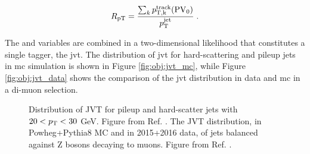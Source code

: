 \begin{equation}
R_\mathrm{pT} = \frac{\sum_k{p_{\rm{T}, k}^{{\rm track}}({\rm PV}_0)}}{p_\mathrm{T}^\mathrm{jet}} \;.
\label{eq:obj:rpt}
\end{equation}

The \cJVF and \RpT variables are combined in a two-dimensional likelihood that constitutes a single tagger, the \gls{jvt}. 
The distribution of \gls{jvt} for hard-scattering and pileup jets in \gls{mc} simulation is shown in Figure \ref{fig:obj:jvt_mc},
while Figure \ref{fig:obj:jvt_data} shows the comparison of the \gls{jvt} distribution in data and \gls{mc} in a di-muon selection.


\begin{figure}[h]
\begin{center}
\end{center}
 \caption{ Distribution of JVT for pileup and hard-scatter jets with $20 < p_{\rm T} < 30$ GeV. Figure from Ref. \cite{ATLAS:2014cva}.  The JVT distribution, in Powheg+Pythia8 MC and in 2015+2016 data, of jets balanced against Z bosons decaying to muons. Figure from Ref. \cite{jvtpublicplots}.}
  \label{fig:obj:jvt}
\end{figure}

